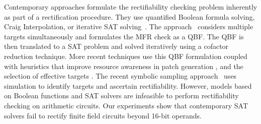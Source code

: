 \par 
Contemporary approaches formulate the rectifiability 
checking problem inherently as part of a rectification procedure. 
They use quantified Boolean formula solving,
Craig Interpolation, or iterative SAT
solving~\cite{MF_Huang:DATE12,SS_Fujita:ISCAS19,SS_Alan:DAC18}.  
The approach~\cite{MF_Huang:DATE12} considers multiple targets simultaneously and 
formulates the MFR check as a QBF. 
The QBF is then translated to a SAT problem and solved iteratively using a cofactor reduction technique.
More recent techniques use this QBF formulation coupled with heuristics that improve
resource awareness in patch generation \cite{SS_Alan:DAC18}, and the selection of effective targets \cite{SS_Fujita:ISCAS19}. 
The recent symbolic sampling approach~\cite{SS_Roland:DAC19} uses simulation to 
identify targets and ascertain rectifiability.
However, models based on Boolean functions and SAT solvers are infeasible to perform rectifiability checking 
on arithmetic circuits. Our experiments show that contemporary SAT solvers fail to rectify finite field circuits beyond 16-bit operands.




